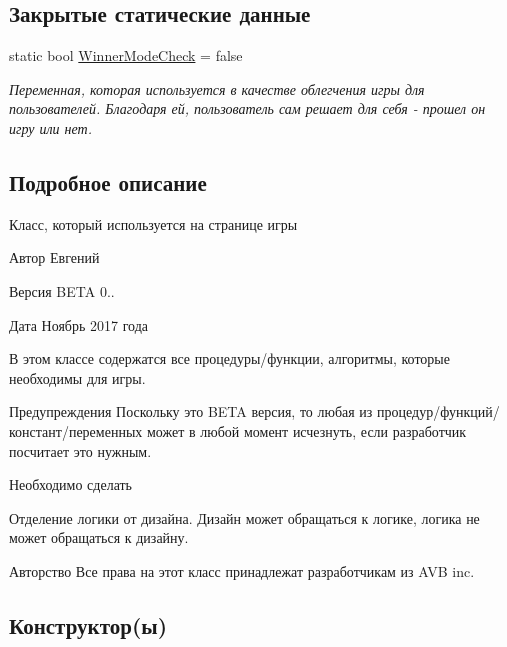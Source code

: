 \subsection*{Закрытые статические данные}
\begin{DoxyCompactItemize}
\item 
static bool \hyperlink{class_pasyans_cover_u_w_p_1_1_game_page_a2bf9a3300a4ab635aeb61d6cf6c2ee13}{Winner\+Mode\+Check} = false
\begin{DoxyCompactList}\small\item\em Переменная, которая используется в качестве облегчения игры для пользователей. Благодаря ей, пользователь сам решает для себя -\/ прошел он игру или нет. \end{DoxyCompactList}\end{DoxyCompactItemize}


\subsection{Подробное описание}
Класс, который используется на странице игры 

\begin{DoxyAuthor}{Автор}
Евгений 
\end{DoxyAuthor}
\begin{DoxyVersion}{Версия}
B\+E\+TA 0.. 
\end{DoxyVersion}
\begin{DoxyDate}{Дата}
Ноябрь 2017 года
\end{DoxyDate}
В этом классе содержатся все процедуры/функции, алгоритмы, которые необходимы для игры. \begin{DoxyWarning}{Предупреждения}
Поскольку это B\+E\+TA версия, то любая из процедур/функций/констант/переменных может в любой момент исчезнуть, если разработчик посчитает это нужным. 
\end{DoxyWarning}
\begin{DoxyRefDesc}{Необходимо сделать}
\item[\hyperlink{todo__todo000001}{Необходимо сделать}]Отделение логики от дизайна. Дизайн может обращаться к логике, логика не может обращаться к дизайну. \end{DoxyRefDesc}
\begin{DoxyCopyright}{Авторство}
Все права на этот класс принадлежат разработчикам из A\+VB inc. 
\end{DoxyCopyright}


\subsection{Конструктор(ы)}
\mbox{\label{class_pasyans_cover_u_w_p_1_1_game_page_ae93f35d902ec5fbb566632b0dc5e0b59}} 
